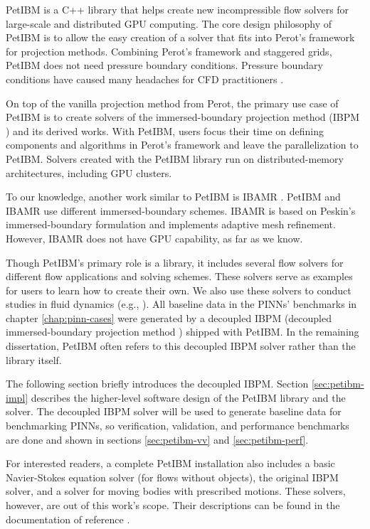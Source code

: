 PetIBM is a C++ library that helps create new incompressible flow solvers for large-scale and distributed GPU computing.
The core design philosophy of PetIBM is to allow the easy creation of a solver that fits into Perot's framework \cite{perot_analysis_1993} for projection methods.
Combining Perot's framework and staggered grids, PetIBM does not need pressure boundary conditions.
Pressure boundary conditions have caused many headaches for CFD practitioners \cite{gresho_pressure_1987,sani_resume_1994}.

On top of the vanilla projection method from Perot, the primary use case of PetIBM is to create solvers of the immersed-boundary projection method (IBPM \cite{taira_immersed_2007}) and its derived works.
With PetIBM, users focus their time on defining components and algorithms in Perot's framework and leave the parallelization to PetIBM.
Solvers created with the PetIBM library run on distributed-memory architectures, including GPU clusters.

To our knowledge, another work similar to PetIBM is IBAMR \cite{griffith_adaptive_2007,bhalla_unified_2013}. 
PetIBM and IBAMR use different immersed-boundary schemes.
IBAMR is based on Peskin's immersed-boundary formulation \cite{Peskin2002} and implements adaptive mesh refinement.
However, IBAMR does not have GPU capability, as far as we know.

Though PetIBM's primary role is a library, it includes several flow solvers for different flow applications and solving schemes.
These solvers serve as examples for users to learn how to create their own.
We also use these solvers to conduct studies in fluid dynamics (e.g., \cite{mesnard_reproducible_2017}).
All baseline data in the PINNs' benchmarks in chapter \ref{chap:pinn-cases} were generated by a decoupled IBPM (decoupled immersed-boundary projection method \cite{li_efficient_2016}) shipped with PetIBM.
In the remaining dissertation, PetIBM often refers to this decoupled IBPM solver rather than the library itself.

The following section briefly introduces the decoupled IBPM.
Section \ref{sec:petibm-impl} describes the higher-level software design of the PetIBM library and the solver.
The decoupled IBPM solver will be used to generate baseline data for benchmarking PINNs, so verification, validation, and performance benchmarks are done and shown in sections \ref{sec:petibm-vv} and \ref{sec:petibm-perf}.

For interested readers, a complete PetIBM installation also includes a basic Navier-Stokes equation solver (for flows without objects), the original IBPM solver, and a solver for moving bodies with prescribed motions.
These solvers, however, are out of this work's scope.
Their descriptions can be found in the documentation of reference \cite{chuang_petibm:_2018}.
